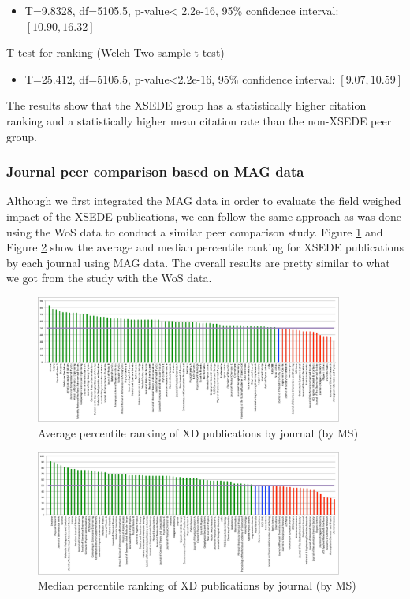 \documentclass{sig-alternate}
\begin{document}
\begin{itemize}
\item T=9.8328, df=5105.5, p-value< 2.2e-16, 95\% confidence interval: $[10.90, 16.32]$
\end{itemize}

T-test for ranking (Welch Two sample t-test)
\begin{itemize}
\item T=25.412, df=5105.5, p-value<2.2e-16, 95\% confidence interval: $[9.07, 10.59]$
\end{itemize}


The results show that the XSEDE group has a statistically higher
citation ranking and a statistically higher mean citation rate than
the non-XSEDE peer group.

\subsubsection{Journal peer comparison based on MAG data}

Although we first integrated the MAG data in order to evaluate the
field weighed impact of the XSEDE publications, we can follow the same
approach as was done using the WoS data to conduct a similar peer
comparison study. Figure \ref{F:ms_peers_byj_mean} and Figure
\ref{F:ms_peers_byj_median} show the average and median percentile
ranking for XSEDE publications by each journal using MAG data. The
overall results are pretty similar to what we got from the study with
the WoS data.

\begin{figure}[htb!]
  \centering
    \includegraphics[width=0.9\textwidth]{images/ms_peers_byj_mean_10.pdf}
    \caption{Average percentile ranking of XD publications by journal (by MS)}
    \label{F:ms_peers_byj_mean}
\end{figure}

\begin{figure}[htb!]
  \centering
    \includegraphics[width=0.9\textwidth]{images/ms_peers_byj_median_10.pdf}
    \caption{Median percentile ranking of XD publications by journal (by MS)}
    \label{F:ms_peers_byj_median}
\end{figure}
\end{document}
